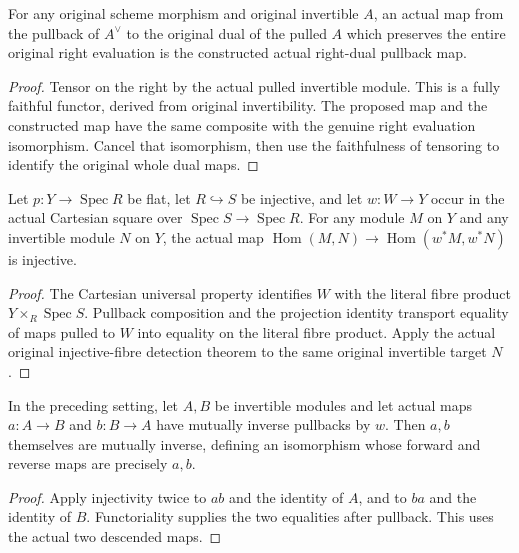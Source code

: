 \begin{lemma}
\label{lem:kn-original-line-right-dual-unique}
\leanok
{}
For any original scheme morphism and original invertible $A$, an actual
map from the pullback of $A^\vee$ to the original dual of the pulled $A$
which preserves the entire original right evaluation is the constructed
actual right-dual pullback map.
\end{lemma}
\begin{proof}
Tensor on the right by the actual pulled invertible module.  This is a
fully faithful functor, derived from original invertibility.  The proposed
map and the constructed map have the same composite with the genuine
right evaluation isomorphism.  Cancel that isomorphism, then use the
faithfulness of tensoring to identify the original whole dual maps.
\end{proof}

\begin{lemma}\label{lem:kn-original-line-cartesian-detection}
\leanok
{}
Let $p:Y\to\operatorname{Spec}R$ be flat, let $R\hookrightarrow S$ be
injective, and let $w:W\to Y$ occur in the actual Cartesian square over
$\operatorname{Spec}S\to\operatorname{Spec}R$.
For any module $M$ on $Y$ and any invertible module $N$ on $Y$, the actual
map $\operatorname{Hom}(M,N)\to\operatorname{Hom}(w^*M,w^*N)$ is injective.
\end{lemma}
\begin{proof}
The Cartesian universal property identifies $W$ with the literal fibre
product $Y\times_R\operatorname{Spec}S$. Pullback composition and the
projection identity transport equality of maps pulled to $W$ into equality
on the literal fibre product. Apply the actual original injective-fibre
detection theorem to the same original invertible target $N$.
\end{proof}

\begin{lemma}\label{lem:kn-original-line-cartesian-inverse}
\leanok
{}
In the preceding setting, let $A,B$ be invertible modules and let actual
maps $a:A\to B$ and $b:B\to A$ have mutually inverse pullbacks by $w$.
Then $a,b$ themselves are mutually inverse, defining an isomorphism whose
forward and reverse maps are precisely $a,b$.
\end{lemma}
\begin{proof}
Apply injectivity twice to $ab$ and the identity of $A$, and to $ba$ and
the identity of $B$. Functoriality supplies the two equalities after
pullback. This uses the actual two descended maps.
\end{proof}
